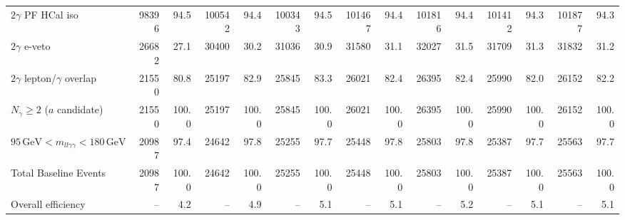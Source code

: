 \begin{table}[htbp]
{\begin{tabular}{lrrrrrrrrrrrrrr}
$2\gamma$ PF HCal iso & 98396 & 94.5 & 100542 & 94.4 & 100343 & 94.5 & 101467 & 94.4 & 101816 & 94.4 & 101412 & 94.3 & 101877 & 94.3 \\
$2\gamma$ e-veto & 26682 & 27.1 & 30400 & 30.2 & 31036 & 30.9 & 31580 & 31.1 & 32027 & 31.5 & 31709 & 31.3 & 31832 & 31.2 \\
$2\gamma$ lepton/$\gamma$ overlap & 21550 & 80.8 & 25197 & 82.9 & 25845 & 83.3 & 26021 & 82.4 & 26395 & 82.4 & 25990 & 82.0 & 26152 & 82.2 \\
$N_{\gamma}\geq 2$ ($a$ candidate) & 21550 & 100.0 & 25197 & 100.0 & 25845 & 100.0 & 26021 & 100.0 & 26395 & 100.0 & 25990 & 100.0 & 26152 & 100.0 \\
$95\,\mathrm{GeV} < m_{ll\gamma\gamma} < 180\,\mathrm{GeV}$ & 20987 & 97.4 & 24642 & 97.8 & 25255 & 97.7 & 25448 & 97.8 & 25803 & 97.8 & 25387 & 97.7 & 25563 & 97.7 \\
Total Baseline Events & 20987 & 100.0 & 24642 & 100.0 & 25255 & 100.0 & 25448 & 100.0 & 25803 & 100.0 & 25387 & 100.0 & 25563 & 100.0 \\
\hline
Overall efficiency & -- & 4.2 & -- & 4.9 & -- & 5.1 & -- & 5.1 & -- & 5.2 & -- & 5.1 & -- & 5.1 \\
\hline
\end{tabular}%
}
\end{table}

